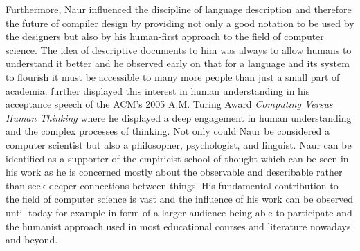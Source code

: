 \documentclass{article}
\begin{document}
Furthermore, Naur influenced the discipline of language description and therefore the future of compiler design by providing not only a good notation to be used by the designers but also by his human-first approach to the field of computer science. The idea of descriptive documents to him was always to allow humans to understand it better and he observed early on that for a language and its system to flourish it must be accessible to many more people than just a small part of academia. \cite{naur2007computing} further displayed this interest in human understanding in his acceptance speech of the ACM's 2005 A.M. Turing Award \textit{Computing Versus Human Thinking} where he displayed a deep engagement in human understanding and the complex processes of thinking. Not only could Naur be considered a computer scientist but also a philosopher, psychologist, and linguist. Naur can be identified as a supporter of the empiricist school of thought which can be seen in his work as he is concerned mostly about the observable and describable rather than seek deeper connections between things. His fundamental contribution to the field of computer science is vast and the influence of his work can be observed until today for example in form of a larger audience being able to participate and the humanist approach used in most educational courses and literature nowadays and beyond.
\newpage


\end{document}
